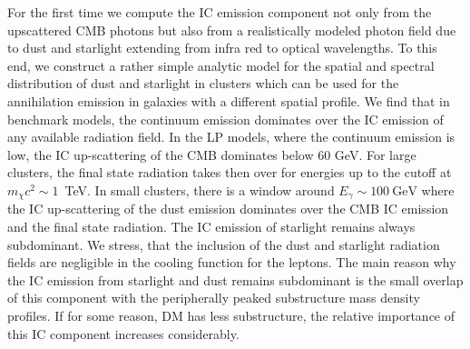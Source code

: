 \documentclass[10pt,aps,pra,reprint,amsmath,amsfonts,amssymb,showpacs,nofootinbib,floatfix]{revtex4-1}
\begin{document}
For the first time we compute the IC emission component not only from
the upscattered CMB photons but also from a realistically modeled
photon field due to dust and starlight extending from infra red to
optical wavelengths. To this end, we construct a rather simple
analytic model for the spatial and spectral distribution of dust and
starlight in clusters which can be used for the annihilation emission
in galaxies with a different spatial profile.  We find that in
benchmark models, the continuum emission dominates over the IC
emission of any available radiation field. In the LP models, where the
continuum emission is low, the IC up-scattering of the CMB dominates
below 60 GeV. For large clusters, the final state radiation takes then
over for energies up to the cutoff at $m_\chi c^2 \sim 1$~TeV. In
small clusters, there is a window around $E_\gamma \sim
100~\mathrm{GeV}$ where the IC up-scattering of the dust emission
dominates over the CMB IC emission and the final state radiation. The
IC emission of starlight remains always subdominant.  We stress, that
the inclusion of the dust and starlight radiation fields are
negligible in the cooling function for the leptons.  The main reason
why the IC emission from starlight and dust remains subdominant is the
small overlap of this component with the peripherally peaked
substructure mass density profiles. If for some reason, DM has less
substructure, the relative importance of this IC component increases
considerably.
\end{document}

